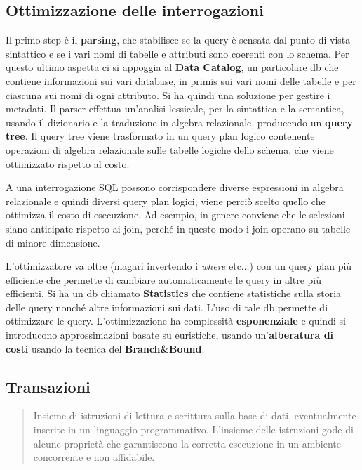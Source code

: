 \subsection{Ottimizzazione delle interrogazioni}

Il primo step è il \textbf{parsing}, che stabilisce se la query è sensata dal punto di vista sintattico e se i vari nomi di tabelle e attributi sono coerenti con lo schema. Per questo ultimo aspetta ci si appoggia al \textbf{Data  Catalog}, un particolare db che contiene informazioni sui vari database, in primis sui vari nomi delle tabelle e per ciascuna sui nomi di ogni attributo.
Si ha quindi una soluzione per gestire i metadati. Il parser effettua un'analisi lessicale, per la sintattica e la semantica, usando il dizionario e la traduzione in algebra relazionale, producendo un \textbf{query tree}. Il query tree viene trasformato in un query plan logico contenente operazioni di algebra relazionale sulle tabelle logiche dello schema, che viene ottimizzato rispetto al costo.

A una interrogazione SQL possono corrispondere diverse espressioni in algebra relazionale e quindi diversi query plan logici, viene perciò scelto quello che ottimizza il costo di esecuzione. Ad esempio, in genere conviene che le selezioni siano anticipate rispetto ai join, perché in questo modo i join operano su tabelle di minore dimensione.

L'ottimizzatore va oltre (magari invertendo i \textit{where} etc$\ldots$)  con un query plan più efficiente che permette di cambiare automaticamente le  query in altre più efficienti. \newline
Si ha un db chiamato \textbf{Statistics} che contiene statistiche sulla storia delle query nonché altre informazioni sui dati. L'uso di tale db permette di ottimizzare le query. L'ottimizzazione ha complessità \textbf{esponenziale} e quindi si introducono approssimazioni basate su euristiche, usando un'\textbf{alberatura di costi} usando la tecnica del \textbf{Branch\&Bound}.
 
\subsection{Transazioni}
\begin{quote}
    Insieme di istruzioni di lettura e scrittura sulla base di dati, eventualmente inserite in un linguaggio programmativo.
    L’insieme delle istruzioni gode di alcune proprietà che garantiscono la corretta esecuzione in un ambiente concorrente e non affidabile.
\end{quote}

